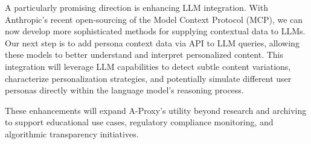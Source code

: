 \documentclass[sigconf]{acmart}
\begin{document}
A particularly promising direction is enhancing LLM integration. With Anthropic's recent open-sourcing of the Model Context Protocol (MCP), we can now develop more sophisticated methods for supplying contextual data to LLMs. Our next step is to add persona context data via API to LLM queries, allowing these models to better understand and interpret personalized content. This integration will leverage LLM capabilities to detect subtle content variations, characterize personalization strategies, and potentially simulate different user personas directly within the language model's reasoning process.

These enhancements will expand A-Proxy's utility beyond research and archiving to support educational use cases, regulatory compliance monitoring, and algorithmic transparency initiatives.



\end{document}
